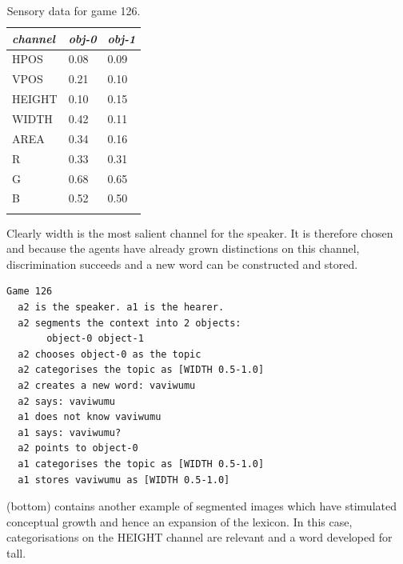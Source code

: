 \begin{table}
\begin{center}
\begin{tabular}{ l  l  l }
\lsptoprule
{\itshape channel}& {\itshape obj-0} & {\itshape obj-1}\\ \midrule
HPOS & 0.08 & 0.09\\ 
VPOS & 0.21 & 0.10\\ 
HEIGHT & 0.10 & 0.15\\ 
WIDTH & 0.42 & 0.11\\ 
AREA & 0.34 & 0.16\\ 
R & 0.33 & 0.31\\ 
G & 0.68 & 0.65\\ 
B & 0.52 & 0.50\\ 
\lspbottomrule
\end{tabular}
\caption{ \label{tab:game126} Sensory data for game 126.}
\end{center}
\end{table}
Clearly width is the most salient channel for the speaker. 
It is therefore chosen and because the 
agents have already grown distinctions on this channel, 
discrimination succeeds and a new word can be
constructed and stored. 
\begin{verbatim}
Game 126 
  a2 is the speaker. a1 is the hearer. 
  a2 segments the context into 2 objects: 
       object-0 object-1
  a2 chooses object-0 as the topic 
  a2 categorises the topic as [WIDTH 0.5-1.0]
  a2 creates a new word: vaviwumu
  a2 says: vaviwumu
  a1 does not know vaviwumu
  a1 says: vaviwumu?
  a2 points to object-0
  a1 categorises the topic as [WIDTH 0.5-1.0]
  a1 stores vaviwumu as [WIDTH 0.5-1.0]
\end{verbatim}
 (bottom) contains another example
of segmented images which have stimulated conceptual
growth and hence an expansion of the lexicon. 
In this case, categorisations on the HEIGHT channel are
relevant and a word developed for tall.

